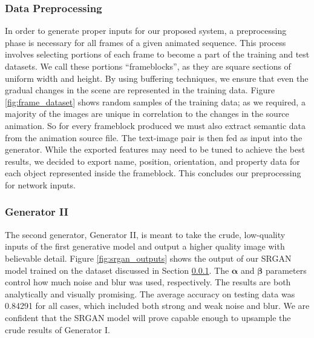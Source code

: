 \documentclass{article}
\begin{document}
\subsubsection{Data Preprocessing}
\label{subsubsec:data}
In order to generate proper inputs for our proposed system,
a preprocessing phase is necessary for all frames of a given
animated sequence. This process involves selecting portions of each frame
to become a part of the training and test datasets.
We call these portions ``frameblocks'', as they are square sections
of uniform width and height.
By using buffering techniques, we ensure that even the gradual changes in the 
scene are represented in the training data.
Figure \ref{fig:frame_dataset} shows random samples of the training data;
as we required, a majority of the images are unique in correlation to the changes
in the source animation.
So for every frameblock produced
we must also extract semantic data from the animation source file.
The text-image pair is then fed as input into the generator.
While the exported features may need to be tuned to achieve the best results,
we decided to export name, position, orientation, and property data for each
object represented inside the frameblock. This concludes our preprocessing
for network inputs.

\subsubsection{Generator II}
The second generator, Generator II,
is meant to take the crude, low-quality inputs of the first generative model
and output a higher quality image with believable detail.
Figure \ref{fig:srgan_outputs} shows the output of our SRGAN model trained
on the dataset discussed in Section \ref{subsubsec:data}.
The $\mathbf{\alpha}$ and $\mathbf{\beta}$ parameters control
how much noise and blur was used, respectively.
The results are both analytically and visually promising.
The average accuracy on testing data was 0.84291 for all cases,
which included both strong and weak noise and blur. We are confident that
the SRGAN model will prove capable enough to upsample the crude results of
Generator I.
\end{document}
